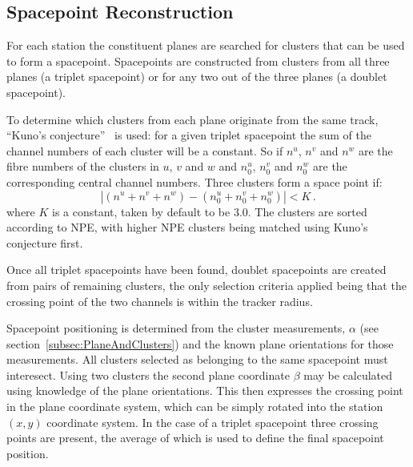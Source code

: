   \subsection{Spacepoint Reconstruction}
  \label{subsec:SpacepointReconstruction}
  For each station the constituent planes are searched for clusters that can be used to form a spacepoint. Spacepoints are constructed from clusters from all three planes (a triplet spacepoint) or for any two out of the three planes (a doublet spacepoint). 

  To determine which clusters from each plane originate from the same track, ``Kuno's conjecture''~\cite{MiceTrackers} is used: for a given triplet spacepoint the sum of the channel numbers of each cluster will be a constant.  So if $n^u$, $n^v$ and $n^w$ are the fibre numbers of the clusters in $u$, $v$ and $w$ and $n^u_0$, $n^v_0$ and $n^w_0$ are the corresponding central channel numbers. Three clusters form a space point if:
  \begin{equation}
    | (n^u + n^v + n^w) - (n^u_0 + n^v_0 + n^w_0) | < K \, .
  \end{equation}
  where $K$ is a constant, taken by default to be 3.0. The clusters are sorted according to NPE, with higher NPE clusters being matched using Kuno's conjecture first. 
  
  Once all triplet spacepoints have been found, doublet spacepoints are created from pairs of remaining clusters, the only selection criteria applied being that the crossing point of the two channels is within the tracker radius. 
  
  Spacepoint positioning is determined from the cluster measurements, $\alpha$ (see section~\ref{subsec:PlaneAndClusters}) and the known plane orientations for those measurements. All clusters selected as belonging to the same spacepoint must interesect. Using two clusters the second plane coordinate $\beta$ may be calculated using knowledge of the plane orientations. This then expresses the crossing point in the plane coordinate system, which can be simply rotated into the station $(x, y)$ coordinate system. In the case of a triplet spacepoint three crossing points are present, the average of which is used to define the final spacepoint position.

%   

